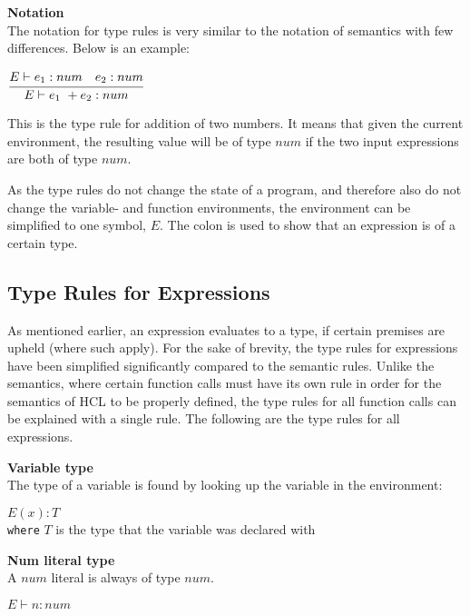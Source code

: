 \textbf{Notation}\\
The notation for type rules is very similar to the notation of semantics with few differences.
Below is an example:\\
\begin{center}
	\begin{math}
	\cfrac
	{E \vdash e_1 : num \quad e_2 : num}
	{E \vdash e_1\ + e_2 : num}
	\end{math}
\end{center}
This is the type rule for addition of two numbers.
It means that given the current environment, the resulting value will be of type $num$ if the two input expressions are both of type $num$.

As the type rules do not change the state of a program, and therefore also do not change the variable- and function environments, the environment can be simplified to one symbol, $E$.
The colon is used to show that an expression is of a certain type.

\subsection{Type Rules for Expressions}
As mentioned earlier, an expression evaluates to a type, if certain premises are upheld (where such apply).
For the sake of brevity, the type rules for expressions have been simplified significantly compared to the semantic rules.
Unlike the semantics, where certain function calls must have its own rule in order for the semantics of HCL to be properly defined, the type rules for all function calls can be explained with a single rule.
The following are the type rules for all expressions.

\textbf{Variable type}\\
The type of a variable is found by looking up the variable in the environment:\\
\begin{center}
	\begin{math}
	E(x) : T
	\end{math}
	\\[1\baselineskip]
	\texttt{where} $T$ is the type that the variable was declared with
\end{center}


\textbf{Num literal type}\\
A $num$ literal is always of type $num$.

\begin{center}
	\begin{math}
		E \vdash n : num
	\end{math}
\end{center}

